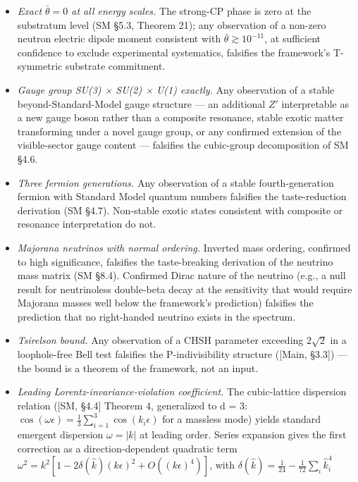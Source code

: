 \documentclass[
]{article}
\providecommand{\tightlist}{%
  \setlength{\itemsep}{0pt}\setlength{\parskip}{0pt}}
\begin{document}
\begin{itemize}
\tightlist
\item
  \emph{Exact \(\bar\theta = 0\) at all energy scales.} The strong-CP
  phase is zero at the substratum level (SM §5.3, Theorem 21); any
  observation of a non-zero neutron electric dipole moment consistent
  with \(\bar\theta \gtrsim 10^{-11}\), at sufficient confidence to
  exclude experimental systematics, falsifies the framework's
  T-symmetric substrate commitment.
\item
  \emph{Gauge group SU(3) × SU(2) × U(1) exactly.} Any observation of a
  stable beyond-Standard-Model gauge structure --- an additional \(Z'\)
  interpretable as a new gauge boson rather than a composite resonance,
  stable exotic matter transforming under a novel gauge group, or any
  confirmed extension of the visible-sector gauge content --- falsifies
  the cubic-group decomposition of SM §4.6.
\item
  \emph{Three fermion generations.} Any observation of a stable
  fourth-generation fermion with Standard Model quantum numbers
  falsifies the taste-reduction derivation (SM §4.7). Non-stable exotic
  states consistent with composite or resonance interpretation do not.
\item
  \emph{Majorana neutrinos with normal ordering.} Inverted mass
  ordering, confirmed to high significance, falsifies the taste-breaking
  derivation of the neutrino mass matrix (SM §8.4). Confirmed Dirac
  nature of the neutrino (e.g., a null result for neutrinoless
  double-beta decay at the sensitivity that would require Majorana
  masses well below the framework's prediction) falsifies the prediction
  that no right-handed neutrino exists in the spectrum.
\item
  \emph{Tsirelson bound.} Any observation of a CHSH parameter exceeding
  \(2\sqrt{2}\) in a loophole-free Bell test falsifies the
  P-indivisibility structure ({[}Main, §3.3{]}) --- the bound is a
  theorem of the framework, not an input.
\item
  \emph{Leading Lorentz-invariance-violation coefficient.} The
  cubic-lattice dispersion relation ({[}SM, §4.4{]} Theorem 4,
  generalized to d = 3:
  \(\cos(\omega\epsilon) = \frac{1}{3}\sum_{i=1}^3 \cos(k_i \epsilon)\)
  for a massless mode) yields standard emergent dispersion
  \(\omega = |k|\) at leading order. Series expansion gives the first
  correction as a direction-dependent quadratic term
  \(\omega^2 = k^2[1 - 2\delta(\hat k)(k\epsilon)^2 + O((k\epsilon)^4)]\),
  with \(\delta(\hat k) = \frac{1}{24} - \frac{1}{72}\sum_i \hat k_i^4\)

\end{itemize}
\end{document}
